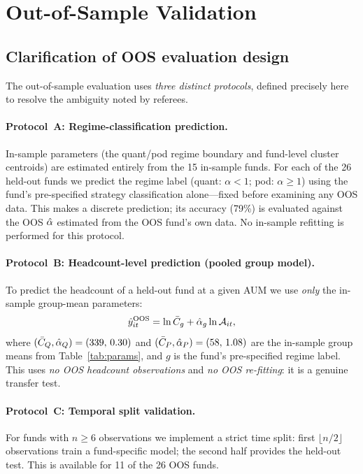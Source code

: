 
\FloatBarrier

\section{\label{sec:oos}Out-of-Sample Validation}

\subsection{Clarification of OOS evaluation design}
\label{sec:oos_design}

The out-of-sample evaluation uses \emph{three distinct protocols},
defined precisely here to resolve the ambiguity noted by referees.

\paragraph{Protocol~A: Regime-classification prediction.}
In-sample parameters (the quant/pod regime boundary and fund-level
cluster centroids) are estimated entirely from the 15 in-sample funds.
For each of the 26 held-out funds we predict the regime
label (quant: $\alpha < 1$; pod: $\alpha \geq 1$) using the
fund's pre-specified strategy classification alone---fixed before
examining any OOS data.
This makes a discrete prediction; its accuracy (79\%) is evaluated
against the OOS $\hat{\alpha}$ estimated from the OOS fund's own data.
No in-sample refitting is performed for this protocol.

\paragraph{Protocol~B: Headcount-level prediction (pooled group model).}
To predict the headcount of a held-out fund at a given AUM we use
\emph{only} the in-sample group-mean parameters:
\begin{equation}
  \hat y_{it}^{\rm OOS}
  = \ln\bar C_g + \hat{\alpha}_g \ln\mathcal{A}_{it},
  \label{eq:group_pred}
\end{equation}
where $(\bar C_Q, \hat{\alpha}_Q) = (339,\, 0.30)$ and
$(\bar C_P, \hat{\alpha}_P) = (58,\, 1.08)$ are the in-sample
group means from Table~\ref{tab:params}, and $g$ is the fund's
pre-specified regime label.
This uses \emph{no OOS headcount observations} and
\emph{no OOS re-fitting}: it is a genuine transfer test.

\paragraph{Protocol~C: Temporal split validation.}
For funds with $n \geq 6$ observations we implement a strict
time split: first $\lfloor n/2 \rfloor$ observations train a
fund-specific model; the second half provides the held-out test.
This is available for 11 of the 26 OOS funds.

